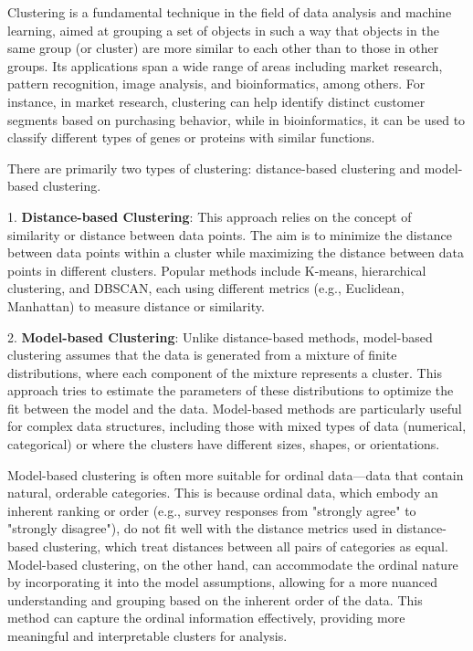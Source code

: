 \documentclass{article}
\begin{document}
Clustering is a fundamental technique in the field of data analysis and machine learning, aimed at grouping a set of objects in such a way that objects in the same group (or cluster) are more similar to each other than to those in other groups. Its applications span a wide range of areas including market research, pattern recognition, image analysis, and bioinformatics, among others. For instance, in market research, clustering can help identify distinct customer segments based on purchasing behavior, while in bioinformatics, it can be used to classify different types of genes or proteins with similar functions.

There are primarily two types of clustering: distance-based clustering and model-based clustering.

1. \textbf{Distance-based Clustering}: This approach relies on the concept of similarity or distance between data points. The aim is to minimize the distance between data points within a cluster while maximizing the distance between data points in different clusters. Popular methods include K-means, hierarchical clustering, and DBSCAN, each using different metrics (e.g., Euclidean, Manhattan) to measure distance or similarity.

2. \textbf{Model-based Clustering}: Unlike distance-based methods, model-based clustering assumes that the data is generated from a mixture of finite distributions, where each component of the mixture represents a cluster. This approach tries to estimate the parameters of these distributions to optimize the fit between the model and the data. Model-based methods are particularly useful for complex data structures, including those with mixed types of data (numerical, categorical) or where the clusters have different sizes, shapes, or orientations.

Model-based clustering is often more suitable for ordinal data—data that contain natural, orderable categories. This is because ordinal data, which embody an inherent ranking or order (e.g., survey responses from "strongly agree" to "strongly disagree"), do not fit well with the distance metrics used in distance-based clustering, which treat distances between all pairs of categories as equal. Model-based clustering, on the other hand, can accommodate the ordinal nature by incorporating it into the model assumptions, allowing for a more nuanced understanding and grouping based on the inherent order of the data. This method can capture the ordinal information effectively, providing more meaningful and interpretable clusters for analysis.
\end{document}
